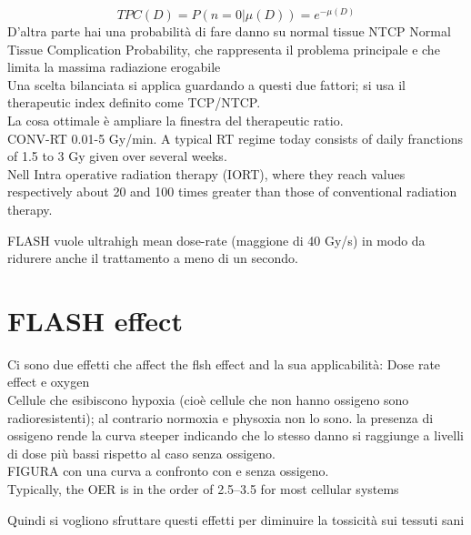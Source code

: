 \begin{equation}
    TPC(D) = P(n=0|\mu(D))= e^{-\mu(D)}
\end{equation} 
D'altra parte hai una probabilità di fare danno su normal tissue NTCP Normal Tissue Complication Probability, che rappresenta il problema principale e che limita la massima radiazione erogabile\\
Una scelta bilanciata si applica guardando a questi due fattori; si usa il therapeutic index definito come TCP/NTCP.\\
La cosa ottimale è ampliare la finestra del therapeutic ratio.\\


CONV-RT 0.01-5 Gy/min. A typical RT regime today consists of daily franctions of 1.5 to 3 Gy given over several weeks.\\
Nell Intra operative radiation therapy (IORT), where they reach values respectively about
20 and 100 times greater than those of conventional radiation therapy.

FLASH vuole ultrahigh mean dose-rate (maggione di 40 Gy/s) in modo da ridurere anche il trattamento a meno di un secondo. \\



\section{FLASH effect}
Ci sono due effetti che affect the flsh effect and la sua applicabilità: Dose rate effect e oxygen\\

Cellule che esibiscono hypoxia (cioè cellule che non hanno ossigeno sono radioresistenti); al contrario normoxia e physoxia non lo sono.
la presenza di ossigeno rende la curva steeper indicando che lo stesso danno si raggiunge a livelli di dose più bassi rispetto al caso senza ossigeno.\\
FIGURA con una curva a confronto con e senza ossigeno.\\
Typically, the OER is in the order of 2.5–3.5 for most cellular systems


Quindi si vogliono sfruttare questi effetti per diminuire la tossicità sui tessuti sani\\





